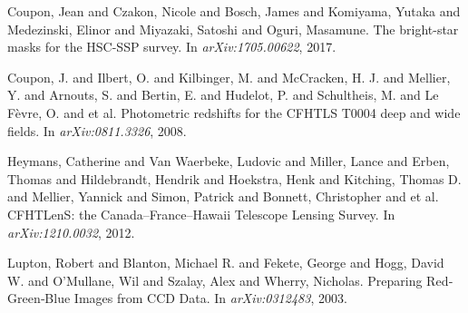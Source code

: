\documentclass{article}
\begin{document}
\begin{thebibliography}{1}
	Coupon, Jean and Czakon, Nicole and Bosch, James and Komiyama, Yutaka and Medezinski, Elinor and Miyazaki, Satoshi and Oguri, Masamune.
	\newblock The bright-star masks for the HSC-SSP survey.
	\newblock In {\em arXiv:1705.00622}, 2017.

	Coupon, J. and Ilbert, O. and Kilbinger, M. and McCracken, H. J. and Mellier, Y. and Arnouts, S. and Bertin, E. and Hudelot, P. and Schultheis, M. and Le Fèvre, O. and et al.
	\newblock Photometric redshifts for the CFHTLS T0004 deep and wide fields.
	\newblock In {\em arXiv:0811.3326}, 2008.

	Heymans, Catherine and Van Waerbeke, Ludovic and Miller, Lance and Erben, Thomas and Hildebrandt, Hendrik and Hoekstra, Henk and Kitching, Thomas D. and Mellier, Yannick and Simon, Patrick and Bonnett, Christopher and et al.
	\newblock CFHTLenS: the Canada–France–Hawaii Telescope Lensing Survey.
	\newblock In {\em arXiv:1210.0032}, 2012.

	Lupton, Robert and Blanton, Michael R. and Fekete, George and Hogg, David W. and O’Mullane, Wil and Szalay, Alex and Wherry, Nicholas.
	\newblock Preparing Red‐Green‐Blue Images from CCD Data.
	\newblock In {\em arXiv:0312483}, 2003.

\end{thebibliography}

\end{document}
